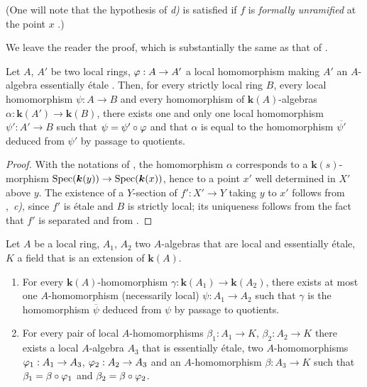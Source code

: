 
(One will note that the hypothesis of \emph{d)} is satisfied if $f$ is \emph{formally unramified} at the point $x$ .)

We leave the reader the proof, which is substantially the same as that of .

\begin{lemma}[18.8.4]
\label{IV.18.8.4}
Let $A$, $A'$ be two local rings, $\varphi:A\to A'$ a local homomorphism making $A'$ an $A$-algebra essentially \'{e}tale .
Then, for every strictly local ring $B$, every local homomorphism $\psi:A\to B$ and every homomorphism of $\boldsymbol{k}(A)$-algebras $\alpha:\boldsymbol{k}(A')\to\boldsymbol{k}(B)$, there exists one and only one local homomorphism $\psi':A'\to B$ such that $\psi=\psi'\circ\varphi$ and that $\alpha$ is equal to the homomorphism $\overline{\psi'}$ deduced from $\psi'$ by passage to quotients.
\end{lemma}

\begin{proof}
With the notations of , the homomorphism $\alpha$ corresponds to a $\boldsymbol{k}(s)$-morphism $\operatorname{Spec}(\boldsymbol{k}(y))\to\operatorname{Spec}(\boldsymbol{k}(x))$, hence to a point $x'$ well determined in $X'$ above $y$.
The existence of a $Y$-section of $f':X'\to Y$ taking $y$ to $x'$ follows from ,~\emph{c)}, since $f'$ is \'{e}tale and $B$ is strictly local; its uniqueness follows from the fact that $f'$ is separated and from .
\end{proof}

\begin{lemma}[18.8.5]
\label{IV.18.8.5}
Let $A$ be a local ring, $A_1$, $A_2$ two $A$-algebras that are local and essentially \'{e}tale, $K$ a field that is an extension of $\boldsymbol{k}(A)$.
\begin{enumerate}[label=\emph{\roman*)}]
  \item For every $\boldsymbol{k}(A)$-homomorphism $\gamma:\boldsymbol{k}(A_1)\to\boldsymbol{k}(A_2)$, there exists at most one $A$-homomorphism (necessarily local) $\psi:A_1\to A_2$ such that $\gamma$ is the homomorphism $\overline{\psi}$ deduced from $\psi$ by passage to quotients.
  \item For every pair of local $A$-homomorphisms $\beta_1:A_1\to K$, $\beta_2:A_2\to K$ there exists a local $A$-algebra $A_3$ that is essentially \'{e}tale, two $A$-homomorphisms $\varphi_1:A_1\to A_3$, $\varphi_2:A_2\to A_3$ and an $A$-homomorphism $\beta:A_3\to K$ such that $\beta_1=\beta\circ\varphi_1$ and $\beta_2=\beta\circ\varphi_2$.
\end{enumerate}
\end{lemma}


